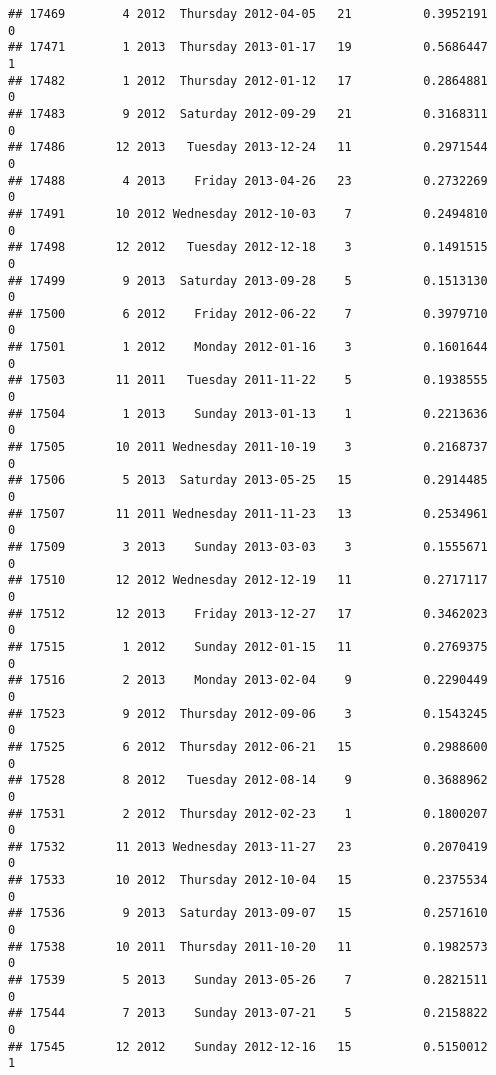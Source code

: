 \documentclass[
]{article}
\begin{document}
\begin{verbatim}
## 17469        4 2012  Thursday 2012-04-05   21          0.3952191             0
## 17471        1 2013  Thursday 2013-01-17   19          0.5686447             1
## 17482        1 2012  Thursday 2012-01-12   17          0.2864881             0
## 17483        9 2012  Saturday 2012-09-29   21          0.3168311             0
## 17486       12 2013   Tuesday 2013-12-24   11          0.2971544             0
## 17488        4 2013    Friday 2013-04-26   23          0.2732269             0
## 17491       10 2012 Wednesday 2012-10-03    7          0.2494810             0
## 17498       12 2012   Tuesday 2012-12-18    3          0.1491515             0
## 17499        9 2013  Saturday 2013-09-28    5          0.1513130             0
## 17500        6 2012    Friday 2012-06-22    7          0.3979710             0
## 17501        1 2012    Monday 2012-01-16    3          0.1601644             0
## 17503       11 2011   Tuesday 2011-11-22    5          0.1938555             0
## 17504        1 2013    Sunday 2013-01-13    1          0.2213636             0
## 17505       10 2011 Wednesday 2011-10-19    3          0.2168737             0
## 17506        5 2013  Saturday 2013-05-25   15          0.2914485             0
## 17507       11 2011 Wednesday 2011-11-23   13          0.2534961             0
## 17509        3 2013    Sunday 2013-03-03    3          0.1555671             0
## 17510       12 2012 Wednesday 2012-12-19   11          0.2717117             0
## 17512       12 2013    Friday 2013-12-27   17          0.3462023             0
## 17515        1 2012    Sunday 2012-01-15   11          0.2769375             0
## 17516        2 2013    Monday 2013-02-04    9          0.2290449             0
## 17523        9 2012  Thursday 2012-09-06    3          0.1543245             0
## 17525        6 2012  Thursday 2012-06-21   15          0.2988600             0
## 17528        8 2012   Tuesday 2012-08-14    9          0.3688962             0
## 17531        2 2012  Thursday 2012-02-23    1          0.1800207             0
## 17532       11 2013 Wednesday 2013-11-27   23          0.2070419             0
## 17533       10 2012  Thursday 2012-10-04   15          0.2375534             0
## 17536        9 2013  Saturday 2013-09-07   15          0.2571610             0
## 17538       10 2011  Thursday 2011-10-20   11          0.1982573             0
## 17539        5 2013    Sunday 2013-05-26    7          0.2821511             0
## 17544        7 2013    Sunday 2013-07-21    5          0.2158822             0
## 17545       12 2012    Sunday 2012-12-16   15          0.5150012             1

\end{verbatim}
\end{document}
